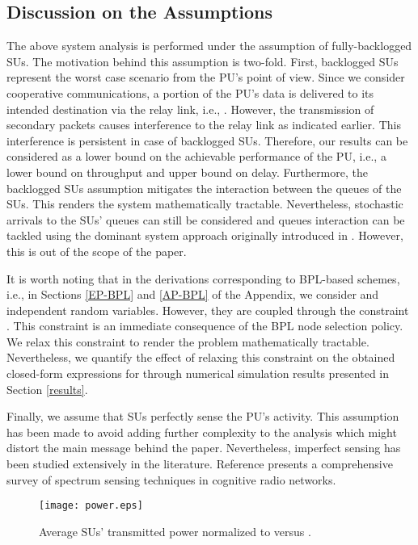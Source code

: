 \documentclass[journal,twocolumn]{IEEEtran}
\begin{document}
\vspace{-3mm}
\subsection{Discussion on the Assumptions}\label{discussion}
The above system analysis is performed under the assumption of fully-backlogged SUs. The motivation behind this assumption is two-fold. First, backlogged SUs represent the worst case scenario from the PU's point of view. Since we consider cooperative communications, a portion of the
PU's data is delivered to its intended destination via the relay link, i.e., . However, the transmission of secondary
packets causes interference to the relay link as indicated earlier. This interference is persistent in case of backlogged SUs. Therefore, our results can be considered as a lower bound on the achievable performance of the PU, i.e., a lower bound on throughput and upper bound on delay. Furthermore, the
backlogged SUs assumption mitigates the interaction between the queues of the SUs. This renders the system mathematically tractable. Nevertheless,
stochastic arrivals to the SUs' queues can still be considered and queues interaction can be tackled using the dominant system approach originally introduced in \cite{rao}. However, this is out of the scope of the paper.

It is worth noting that in the derivations corresponding to BPL-based schemes, i.e., in Sections \ref{EP-BPL} and \ref{AP-BPL} of the Appendix, we consider  and  independent random variables. However, they are coupled through the constraint . This constraint is an immediate consequence of the BPL node selection policy. We relax this constraint to render the problem mathematically tractable. Nevertheless, we quantify the effect of relaxing this constraint on the obtained closed-form expressions for  through numerical simulation results presented in Section \ref{results}.

Finally, we assume that SUs perfectly sense the PU's activity. This assumption has been made to avoid adding further complexity to the analysis which might distort the main message behind the paper. Nevertheless, imperfect sensing has been studied extensively in the literature. Reference \cite{yucek2009survey} presents a comprehensive survey of spectrum sensing techniques in cognitive radio networks.


\begin{figure}[t]
	\centering
	\texttt{[image: power.eps]}
	\caption{Average SUs' transmitted power normalized to  versus .}
	\vspace{-3mm}
	\label{Fig8}
\end{figure}
\end{document}
